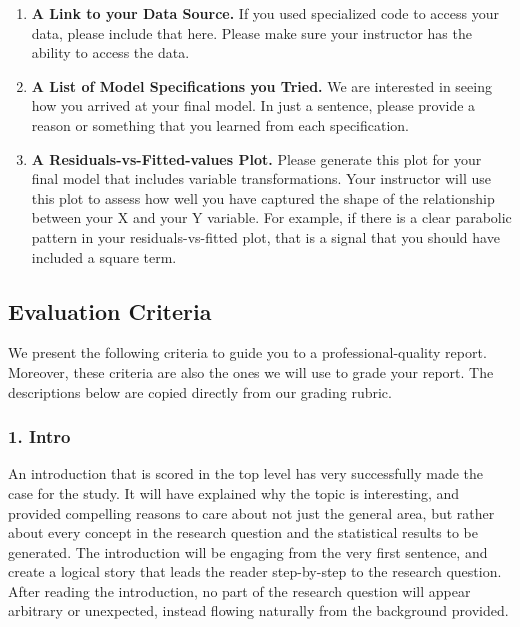 \documentclass[
  letterpaper,
  DIV=11,
  numbers=noendperiod]{scrartcl}
\providecommand{\tightlist}{%
  \setlength{\itemsep}{0pt}\setlength{\parskip}{0pt}}\usepackage{longtable,booktabs,array}
\begin{document}
\begin{enumerate}
\def\labelenumi{\arabic{enumi}.}
\tightlist
\item
  \textbf{A Link to your Data Source.} If you used specialized code to
  access your data, please include that here. Please make sure your
  instructor has the ability to access the data.
\item
  \textbf{A List of Model Specifications you Tried.} We are interested
  in seeing how you arrived at your final model. In just a sentence,
  please provide a reason or something that you learned from each
  specification.
\item
  \textbf{A Residuals-vs-Fitted-values Plot.} Please generate this plot
  for your final model that includes variable transformations. Your
  instructor will use this plot to assess how well you have captured the
  shape of the relationship between your X and your Y variable. For
  example, if there is a clear parabolic pattern in your
  residuals-vs-fitted plot, that is a signal that you should have
  included a square term.
\end{enumerate}

\subsection{Evaluation Criteria}\label{evaluation-criteria}

We present the following criteria to guide you to a professional-quality
report. Moreover, these criteria are also the ones we will use to grade
your report. The descriptions below are copied directly from our grading
rubric.

\subsubsection{1. Intro}\label{intro}

An introduction that is scored in the top level has very successfully
made the case for the study. It will have explained why the topic is
interesting, and provided compelling reasons to care about not just the
general area, but rather about every concept in the research question
and the statistical results to be generated. The introduction will be
engaging from the very first sentence, and create a logical story that
leads the reader step-by-step to the research question. After reading
the introduction, no part of the research question will appear arbitrary
or unexpected, instead flowing naturally from the background provided.
\end{document}
